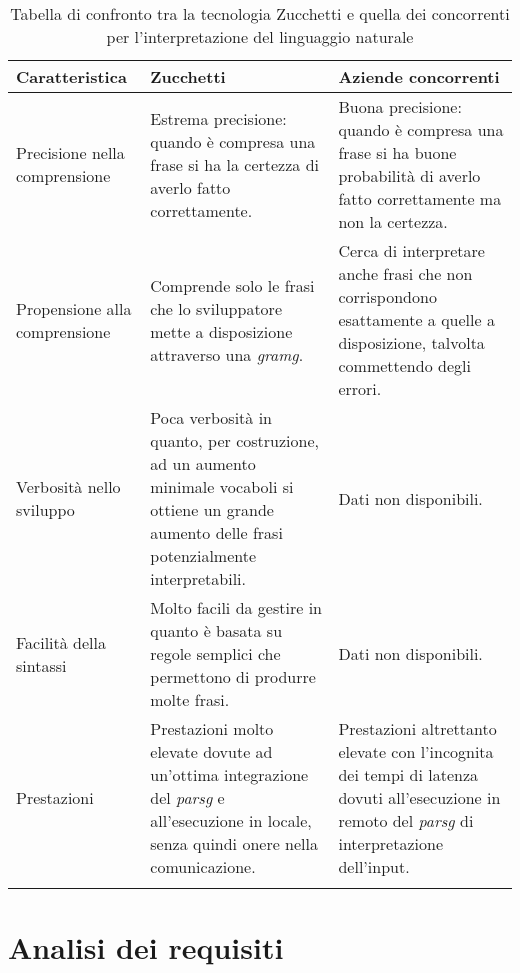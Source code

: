 	\begin{longtable}{|p{3cm}|p{4.5cm}|p{4.5cm}|}
		\hline
		\textbf{Caratteristica} & \textbf{Zucchetti} & \textbf{Aziende concorrenti} \\\hline
		
		Precisione nella comprensione & Estrema precisione: quando è compresa una frase si ha la certezza di averlo fatto correttamente.  & Buona precisione: quando è compresa una frase si ha buone probabilità di averlo fatto correttamente ma non la certezza. \\
		\hline
		Propensione alla comprensione & Comprende solo le frasi che lo sviluppatore mette a disposizione attraverso una \emph{\gls{gramg}}. & Cerca di interpretare anche frasi che non corrispondono esattamente a quelle a disposizione, talvolta commettendo degli errori. \\
		\hline
		Verbosità nello sviluppo & Poca verbosità in quanto, per costruzione, ad un aumento minimale vocaboli si ottiene un grande aumento delle frasi potenzialmente interpretabili. & Dati non disponibili. \\
		\hline
		Facilità della sintassi & Molto facili da gestire in quanto è basata su regole semplici che permettono di produrre molte frasi. & Dati non disponibili. \\
		\hline
		Prestazioni & Prestazioni molto elevate dovute ad un'ottima integrazione del \emph{\gls{parsg}} e all'esecuzione in locale, senza quindi onere nella comunicazione. & Prestazioni altrettanto elevate con l'incognita dei tempi di latenza dovuti all'esecuzione in remoto del \emph{\gls{parsg}} di interpretazione dell'input. \\
		\hline
		\caption{Tabella di confronto tra la tecnologia Zucchetti e quella dei concorrenti per l'interpretazione del linguaggio naturale}
	\end{longtable}

\section{Analisi dei requisiti}
